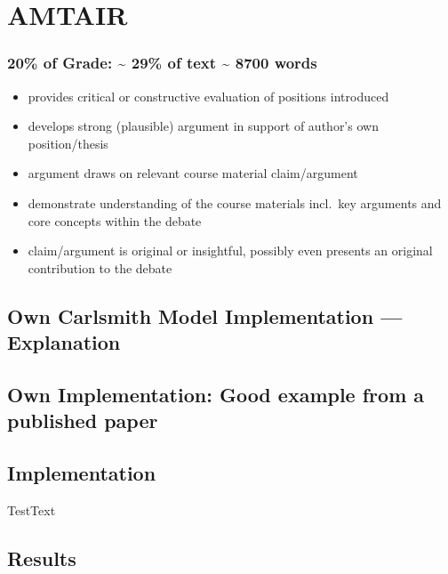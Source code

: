 \documentclass[
  letterpaper,
]{book}
\providecommand{\tightlist}{%
  \setlength{\itemsep}{0pt}\setlength{\parskip}{0pt}}
\begin{document}

\chapter{AMTAIR}\label{amtair}

\subsection{20\% of Grade: \textasciitilde{} 29\% of text
\textasciitilde{} 8700 words}\label{of-grade-29-of-text-8700-words}

\begin{itemize}
\tightlist
\item
  provides critical or constructive evaluation of positions introduced
\item
  develops strong (plausible) argument in support of author's own
  position/thesis
\item
  argument draws on relevant course material claim/argument
\item
  demonstrate understanding of the course materials incl.~key arguments
  and core concepts within the debate
\item
  claim/argument is original or insightful, possibly even presents an
  original contribution to the debate
\end{itemize}

\section{Own Carlsmith Model Implementation ---
Explanation}\label{own-carlsmith-model-implementation-explanation}

\section{Own Implementation: Good example from a published
paper}\label{own-implementation-good-example-from-a-published-paper}

\section{Implementation}\label{implementation}

TestText

\section{Results}\label{results}
\end{document}
